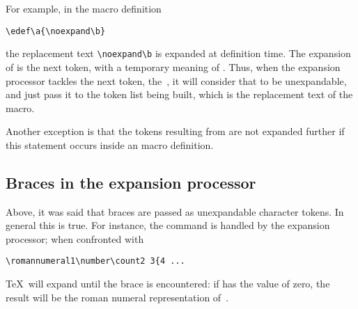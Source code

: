 \documentclass{book}
\begin{document}
For example,
in the macro definition
\begin{verbatim}
\edef\a{\noexpand\b}
\end{verbatim}
the replacement text \verb>\noexpand\b> is expanded at definition 
time. The expansion of  is the next token, with
a temporary meaning of . Thus, when the expansion
processor tackles the next token, the~, it will consider
that to be unexpandable, and just pass it to the token list
being built, which is the replacement text of the macro.

Another exception is that the tokens
resulting from 
are not expanded further if this statement occurs
inside an  macro definition.

\subsection{Braces in the expansion processor}

Above, it was said that braces are passed as unexpandable
character tokens. In general this is true. For instance,
the  command is handled by the expansion
processor; when confronted with 
\begin{verbatim}
\romannumeral1\number\count2 3{4 ...
\end{verbatim} 
\TeX\ will expand until the brace is encountered:
if  has the value of zero, the result will be
the roman numeral representation of~.
\end{document}
